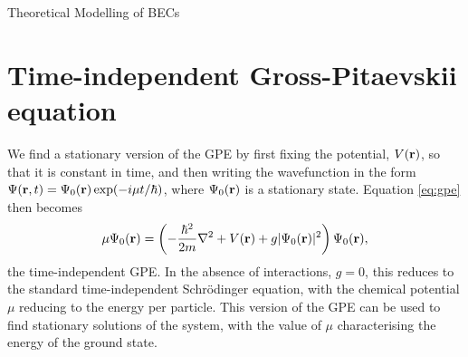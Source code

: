 \begin{chapter}{\label{cha:theoretical_model}Theoretical Modelling of BECs}
\section{\label{section:gpestationary} Time-independent Gross-Pitaevskii equation}
 We find a stationary version of the GPE by first fixing the potential, $V({\bf r})$, so that it is constant in time, and then writing the wavefunction in the form $\Psi({\bf r},t) = \Psi_0({\bf r}) \exp (-i\mu t / \hbar)$, where $\Psi_0({\bf r})$ is a stationary state. Equation \ref{eq:gpe} then becomes
	\begin{equation}\label{eq:stationgpe}
		\mu\Psi_0({\bf r}) = \left( -\frac{\hbar^2}{2m}\nabla^2 + V({\bf r}) + g|\Psi_0({\bf r})|^2  \right) \Psi_0({\bf r}),
	\end{equation}
	the time-independent GPE. In the absence of interactions, $g=0$, this reduces to the standard time-independent Schr\"odinger equation, with the chemical potential $\mu$ reducing to the energy per particle. This version of the GPE can be used to find stationary solutions of the system, with the value of $\mu$ characterising the energy of the ground state.


\end{chapter}

